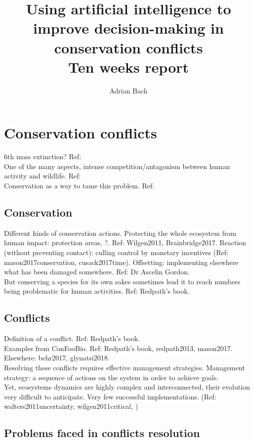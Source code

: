 \documentclass[12pt,a4paper]{article}
\author{Adrian Bach}
\title{Using artificial intelligence to improve decision-making in conservation conflicts \\\medskip Ten weeks report}
\begin{document}
\maketitle

\tableofcontents

\newpage
\section{Conservation conflicts}

6th mass extinction? Ref: \\
One of the many aspects, intense competition/antagonism between human activity and wildlife. Ref: \\
Conservation as a way to tame this problem. Ref: \\

\subsection{Conservation}

Different kinds of conservation actions.
Protecting the whole ecosystem from human impact: protection areas, ?. Ref: Wilgen2011, Brainbridge2017.
Reaction (without preventing contact): culling control by monetary incentives (Ref: mason2017conservation, cusack2017time).
Offsetting: implementing elsewhere what has been damaged somewhere. Ref: Dr Ascelin Gordon.\\
But conserving a species for its own sakes sometimes lead it to reach numbers being problematic for human activities. Ref: Redpath's book.

\subsection{Conflicts}

Definition of a conflict. Ref: Redpath's book.\\
Examples from ConFooBio. Ref: Redpath's book, redpath2013, mason2017.
Elsewhere: behr2017, glynatsi2018.\\
Resolving these conflicts requires effective management strategies.
Management strategy: a sequence of actions on the system in order to achieve goals.\\
Yet, ecosystems dynamics are highly complex and interconnected, their evolution very difficult to anticipate.
Very few successful implementations. (Ref: walters2011uncertainty, wilgen2011critical, )

\subsection{Problems faced in conflicts resolution}
\end{document}
